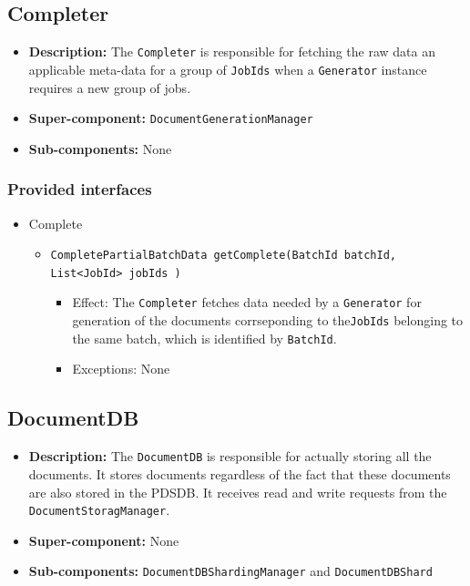 \documentclass[a4paper,10pt]{article}
\begin{document}
\subsection{Completer}
\begin{itemize}
    \item \textbf{Description:} The \texttt{Completer} is responsible for fetching the raw data an applicable meta-data for a group of \texttt{JobIds} when a \texttt{Generator} instance requires a new group of jobs.
    \item \textbf{Super-component:} \texttt{DocumentGenerationManager}
    \item \textbf{Sub-components:} None
\end{itemize}

\subsubsection*{Provided interfaces}
\begin{itemize}
    \item Complete
    \begin{itemize}
        \item \texttt{CompletePartialBatchData getComplete(BatchId batchId, List<JobId> jobIds )}
        \begin{itemize}
            \item Effect: The \texttt{Completer} fetches data needed by a \texttt{Generator} for generation of the documents corrseponding to the\texttt{JobIds} belonging to the same batch, which is identified by \texttt{BatchId}.
            \item Exceptions: None
        \end{itemize}
    \end{itemize}
\end{itemize}

\subsection{DocumentDB}
\begin{itemize}
    \item \textbf{Description:} The \texttt{DocumentDB} is responsible  for actually storing all the documents. It stores documents regardless of the fact that these documents are also stored in the PDSDB. It receives read and write requests from the \texttt{DocumentStoragManager}.
    \item \textbf{Super-component:} None
    \item \textbf{Sub-components:} \texttt{DocumentDBShardingManager} and \texttt{DocumentDBShard}
\end{itemize}
\end{document}
